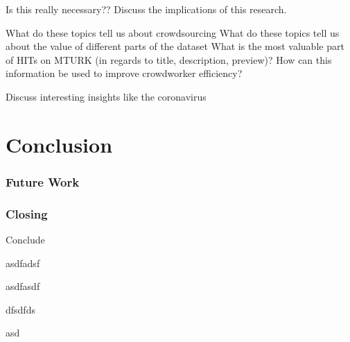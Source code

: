 \documentclass[letterpaper,12pt]{article}
\begin{document}
Is this really necessary??
Discuss the implications of this research.

What do these topics tell us about crowdsourcing
What do these topics tell us about the value of different parts of the dataset
What is the most valuable part of HITs on MTURK (in regards to title, description, preview)?
How can this information be used to improve crowdworker efficiency?

Discuss interesting insights like the coronavirus
\chapter{Conclusion}


\subsection{Future Work}

\subsection{Closing}
Conclude





asdfadsf

asdfasdf

dfsdfds

asd 



\end{document}
